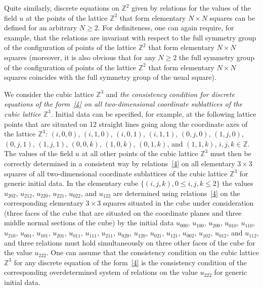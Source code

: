 \documentclass[11pt]{article}
\begin{document}
Quite similarly, discrete equations on $\mathbb{Z}^2$ given by
relations for the values of the f\/ield $u$ at the points of the
lattice $\mathbb{Z}^2$ that form elementary $N \times N$ squares can
be def\/ined for an arbitrary $N \geq 2$. For def\/initeness, one can
again require, for example, that the relations are invariant with
respect to the full symmetry group of the conf\/iguration of points of
the lattice $\mathbb{Z}^2$ that form elementary $N \times N$ squares
(moreover, it is also obvious that for any $N \geq 2$ the full
symmetry group of the conf\/iguration of points of the lattice
$\mathbb{Z}^2$ that form elementary $N \times N$ squares coincides
with the full symmetry group of the usual square).


We consider the cubic lattice $\mathbb{Z}^3$ and {\it the
consistency condition for discrete equations of the form~\eqref{4}
on all two-dimensional coordinate sublattices of the
cubic lattice $\mathbb{Z}^3$}. Initial data can be specif\/ied, for
example, at the following lattice points that are situated on 12
straight lines going along the coordinate axes of the lattice
$\mathbb{Z}^3$: $(i, 0, 0)$, $(i, 1, 0)$, $(i, 0, 1)$, $(i, 1, 1)$,
$(0, j, 0)$, $(1, j, 0)$, $(0, j, 1)$, $(1, j, 1)$, $(0, 0, k)$,
$(1, 0, k)$, $(0, 1, k)$, and $(1, 1, k)$, $i, j, k \in \mathbb{Z}$.
The values of the f\/ield $u$ at all other points of the cubic lattice
$\mathbb{Z}^3$ must then be correctly determined in a consistent way
by relations~\eqref{4} on all elementary $3 \times 3$ squares of all
two-dimensional coordinate sublattices of the cubic lattice
$\mathbb{Z}^3$ for generic initial data. In the elementary cube
$\{(i, j, k), 0 \leq i, j, k \leq 2 \}$ the values $u_{2 0 2}$,
$u_{2 1 2}$, $u_{2 2 0}$, $u_{2 2 1}$, $u_{0 2 2}$, and $u_{1 2 2}$
are determined using relations~\eqref{4} on the corresponding
elementary $3 \times 3$ squares situated in the cube under
consideration (three faces of the cube that are situated on the coordinate planes
and three middle normal sections of the
cube) by the initial data $u_{0 0 0}$, $u_{1 0 0}$, $u_{2 0 0}$,
$u_{0 1 0}$, $u_{1 1 0}$, $u_{2 1 0}$, $u_{0 0 1}$, $u_{1 0 1}$,
$u_{2 0 1}$, $u_{0 1 1}$, $u_{1 1 1}$, $u_{2 1 1}$, $u_{0 2 0}$,
$u_{1 2 0}$, $u_{0 2 1}$, $u_{1 2 1}$, $u_{0 0 2}$, $u_{1 0 2}$,
$u_{0 1 2}$, and $u_{1 1 2}$, and three relations must hold
simultaneously on three other faces of the cube for the value $u_{2 2 2}$.
One can assume that the consistency condition on the cubic lattice
$\mathbb{Z}^3$ for any discrete equation of the form~\eqref{4} is
the consistency condition of the corresponding overdetermined system
of relations on the value $u_{2 2 2}$ for generic initial data.
\end{document}
